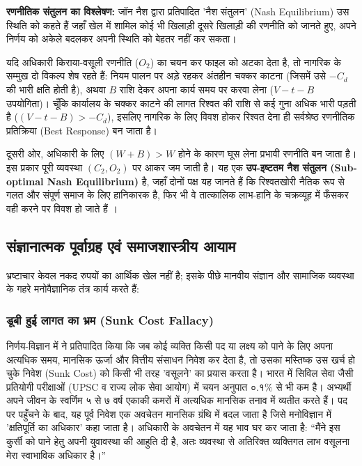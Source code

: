 \documentclass[11pt, a4paper]{article}
\begin{document}
\noindent \textbf{रणनीतिक संतुलन का विश्लेषण:} 
जॉन नैश द्वारा प्रतिपादित 'नैश संतुलन' (Nash Equilibrium) उस स्थिति को कहते हैं जहाँ खेल में शामिल कोई भी खिलाड़ी दूसरे खिलाड़ी की रणनीति को जानते हुए, अपने निर्णय को अकेले बदलकर अपनी स्थिति को बेहतर नहीं कर सकता। 

यदि अधिकारी किराया-वसूली रणनीति ($O_2$) का चयन कर फाइल को अटका देता है, तो नागरिक के सम्मुख दो विकल्प शेष रहते हैं: नियम पालन पर अड़े रहकर अंतहीन चक्कर काटना (जिसमें उसे $-C_d$ की भारी क्षति होती है), अथवा $B$ राशि देकर अपना कार्य समय पर करवा लेना ($V - t - B$ उपयोगिता)। चूँकि कार्यालय के चक्कर काटने की लागत रिश्वत की राशि से कई गुना अधिक भारी पड़ती है ($(V - t - B) > -C_d$), इसलिए नागरिक के लिए विवश होकर रिश्वत देना ही सर्वश्रेष्ठ रणनीतिक प्रतिक्रिया (Best Response) बन जाता है। 

दूसरी ओर, अधिकारी के लिए $(W + B) > W$ होने के कारण घूस लेना प्रभावी रणनीति बन जाता है। इस प्रकार पूरी व्यवस्था $(C_2, O_2)$ पर आकर जम जाती है। यह एक \textbf{उप-इष्टतम नैश संतुलन (Sub-optimal Nash Equilibrium)} है, जहाँ दोनों पक्ष यह जानते हैं कि रिश्वतखोरी नैतिक रूप से गलत और संपूर्ण समाज के लिए हानिकारक है, फिर भी वे तात्कालिक लाभ-हानि के चक्रव्यूह में फँसकर वही करने पर विवश हो जाते हैं \citep{aidt2003, bardhan1997, mishra2006}।

\subsection{संज्ञानात्मक पूर्वाग्रह एवं समाजशास्त्रीय आयाम}

भ्रष्टाचार केवल नकद रुपयों का आर्थिक खेल नहीं है; इसके पीछे मानवीय संज्ञान और सामाजिक व्यवस्था के गहरे मनोवैज्ञानिक तंत्र कार्य करते हैं:

\subsubsection{डूबी हुई लागत का भ्रम (Sunk Cost Fallacy)} 
निर्णय-विज्ञान में \citep{arkes1985} ने प्रतिपादित किया कि जब कोई व्यक्ति किसी पद या लक्ष्य को पाने के लिए अपना अत्यधिक समय, मानसिक ऊर्जा और वित्तीय संसाधन निवेश कर देता है, तो उसका मस्तिष्क उस खर्च हो चुके निवेश (Sunk Cost) को किसी भी तरह 'वसूलने' का प्रयास करता है। भारत में सिविल सेवा जैसी प्रतियोगी परीक्षाओं (UPSC व राज्य लोक सेवा आयोग) में चयन अनुपात $०.१\%$ से भी कम है। अभ्यर्थी अपने जीवन के स्वर्णिम ५ से ७ वर्ष एकाकी कमरों में अत्यधिक मानसिक तनाव में व्यतीत करते हैं। पद पर पहुँचने के बाद, यह पूर्व निवेश एक अवचेतन मानसिक ग्रंथि में बदल जाता है जिसे मनोविज्ञान में 'क्षतिपूर्ति का अधिकार' \citep[Psychological Entitlement;][]{campbell2004} कहा जाता है। अधिकारी के अवचेतन में यह भाव घर कर जाता है: ``मैंने इस कुर्सी को पाने हेतु अपनी युवावस्था की आहुति दी है, अतः व्यवस्था से अतिरिक्त व्यक्तिगत लाभ वसूलना मेरा स्वाभाविक अधिकार है।''
\end{document}
